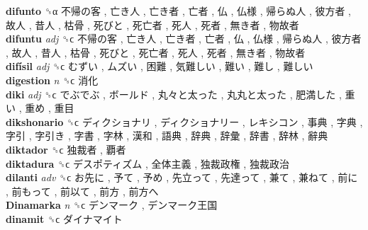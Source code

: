 \textbf{difunto} ␝α   不帰の客 ,  亡き人 ,  亡き者 ,  亡者 ,  仏 ,  仏様 ,  帰らぬ人 ,  彼方者 ,  故人 ,  昔人 ,  枯骨 ,  死びと ,  死亡者 ,  死人 ,  死者 ,  無き者 ,  物故者   \\
\textbf{difuntu} \emph{adj}  ␝ϲ   不帰の客 ,  亡き人 ,  亡き者 ,  亡者 ,  仏 ,  仏様 ,  帰らぬ人 ,  彼方者 ,  故人 ,  昔人 ,  枯骨 ,  死びと ,  死亡者 ,  死人 ,  死者 ,  無き者 ,  物故者   \\
\textbf{difísil} \emph{adj}  ␝ϲ   むずい ,  ムズい ,  困難 ,  気難しい ,  難い ,  難し ,  難しい   \\
\textbf{digestion} \emph{n}  ␝ϲ   消化   \\
\textbf{diki} \emph{adj}  ␝ϲ   でぶでぶ ,  ボールド ,  丸々と太った ,  丸丸と太った ,  肥満した ,  重い ,  重め ,  重目   \\
\textbf{dikshonario} ␝ϲ   ディクショナリ ,  ディクショナリー ,  レキシコン ,  事典 ,  字典 ,  字引 ,  字引き ,  字書 ,  字林 ,  漢和 ,  語典 ,  辞典 ,  辞彙 ,  辞書 ,  辞林 ,  辭典   \\
\textbf{diktador} ␝ϲ   独裁者 ,  覇者   \\
\textbf{diktadura} ␝ϲ   デスポティズム ,  全体主義 ,  独裁政権 ,  独裁政治   \\
\textbf{dilanti} \emph{adv}  ␝ϲ   お先に ,  予て ,  予め ,  先立って ,  先達って ,  兼て ,  兼ねて ,  前に ,  前もって ,  前以て ,  前方 ,  前方へ   \\
\textbf{Dinamarka} \emph{n}  ␝ϲ   デンマーク ,  デンマーク王国   \\
\textbf{dinamit} ␝ϲ   ダイナマイト   \\
